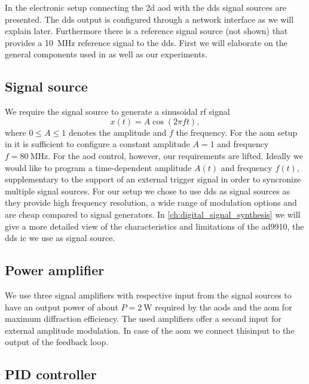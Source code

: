 In  the electronic setup connecting the \gls{2d}
\gls{aod} with the \gls{dds} signal sources are presented. The \gls{dds}
output is configured through a network interface as we will explain later.
Furthermore there is a reference signal source (not shown) that provides a
\SI{10}{\mega\hertz} reference signal to the \gls{dds}. First we will
elaborate on the general components used in  as well as
our experiments.

\subsection{Signal source}\label{subsec:setup_signal_source}

We require the signal source to generate a sinusoidal \gls{rf} signal
\begin{equation}
  x(t)
  =A\cos\left(2\pi ft\right)
  \label{eq:signal},
\end{equation}
where $0\leq A\leq1$ denotes the amplitude and $f$ the frequency. For the
\gls{aom} setup in  it is sufficient to configure
a constant amplitude $A=1$ and frequency $f=\SI{80}{\mega\hertz}$. For the
\gls{aod} control, however, our requirements are lifted. Ideally we would
like to program a time-dependent amplitude $A(t)$ and frequency $f(t)$,
supplementary to the support of an external trigger signal in order to
syncronize multiple signal sources. For our setup we chose to use \gls{dds}
as signal sources as they provide high frequency resolution, a wide range of
modulation options and are cheap compared to signal generators. In
\cref{ch:digital_signal_synthesis} we will give a more detailed view of the
characteristics and limitations of the \gls{ad9910}, the \gls{dds} \gls{ic}
we use as signal source.

\subsection{Power amplifier}

We use three signal amplifiers with respective input from the signal sources
to have an output power of about $P=\SI{2}{\watt}$ required by the \gls{aod}s
and the \gls{aom} for maximum diffraction efficiency. The used amplifiers
offer a second input for external amplitude modulation. In case of the
\gls{aom} we connect thisinput to the output of the feedback loop.

\subsection{PID controller}

